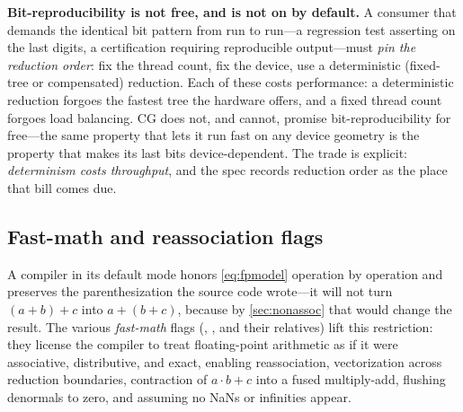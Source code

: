 \begin{pitfall}
\textbf{Bit-reproducibility is not free, and is not on by default.} A consumer that
demands the identical bit pattern from run to run---a regression test asserting on
the last digits, a certification requiring reproducible output---must \emph{pin the
reduction order}: fix the thread count, fix the device, use a deterministic
(fixed-tree or compensated) reduction. Each of these costs performance: a
deterministic reduction forgoes the fastest tree the hardware offers, and a
fixed thread count forgoes load balancing. CG does not, and cannot, promise
bit-reproducibility for free---the same property that lets it run fast on any device
geometry is the property that makes its last bits device-dependent. The trade is
explicit: \emph{determinism costs throughput}, and the spec records reduction order
as the place that bill comes due.
\end{pitfall}

\subsection{Fast-math and reassociation flags}
\label{sec:fastmath}

A compiler in its default mode honors \eqref{eq:fpmodel} operation by operation and
preserves the parenthesization the source code wrote---it will not turn
$(a+b)+c$ into $a+(b+c)$, because by \cref{sec:nonassoc} that would change the
result. The various \emph{fast-math} flags (,
, and their relatives) lift this restriction:
they license the compiler to treat floating-point arithmetic as if it were
associative, distributive, and exact, enabling reassociation, vectorization across
reduction boundaries, contraction of $a\cdot b + c$ into a fused multiply-add,
flushing denormals to zero, and assuming no NaNs or infinities appear.

